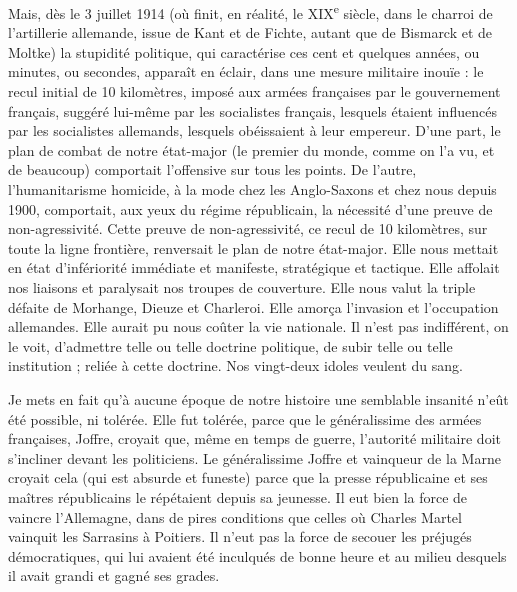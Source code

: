 \documentclass[french,twoside]{book} %
\begin{document}
Mais, dès le 3 juillet 1914 (où finit, en réalité, le XIX\textsuperscript{e} siècle, dans le charroi de l’artillerie allemande, issue de Kant et de Fichte, autant que de Bismarck et de Moltke) la stupidité politique, qui caractérise ces cent et quelques années, ou minutes, ou secondes, apparaît en éclair, dans une mesure militaire inouïe : le recul initial de 10 kilomètres, imposé aux armées françaises par le gouvernement français, suggéré lui-même par les socialistes français, lesquels étaient influencés par les socialistes allemands, lesquels obéissaient à leur empereur. D’une part, le plan de combat de notre état-major (le premier du monde, comme on l’a vu, et de beaucoup) comportait l’offensive sur tous les points. De l’autre, l’humanitarisme homicide, à la mode chez les Anglo-Saxons et chez nous depuis 1900, comportait, aux yeux du régime républicain, la nécessité d’une preuve de non-agressivité. Cette preuve de non-agressivité, ce recul de 10 kilomètres, sur toute la ligne frontière, renversait le plan de notre état-major. Elle nous mettait en état d’infériorité immédiate et manifeste, stratégique et tactique. Elle affolait nos liaisons et paralysait nos troupes de couverture. Elle nous valut la triple défaite de Morhange, Dieuze et Charleroi. Elle amorça l’invasion et l’occupation allemandes. Elle aurait pu nous coûter la vie nationale. Il n’est pas indifférent, on le voit, d’admettre telle ou telle doctrine politique, de subir telle ou telle institution ; reliée à cette doctrine. Nos vingt-deux idoles veulent du sang.\par
Je mets en fait qu’à aucune époque de notre histoire une semblable insanité n’eût été possible, ni tolérée. Elle fut tolérée, parce que le généralissime des armées françaises, Joffre, croyait que, même en temps de guerre, l’autorité militaire doit s’incliner devant les politiciens. Le généralissime Joffre et vainqueur de la Marne croyait cela (qui est absurde et funeste) parce que la presse républicaine et ses maîtres républicains le répétaient depuis sa jeunesse. Il eut bien la force de vaincre l’Allemagne, dans de pires conditions que celles où Charles Martel vainquit les Sarrasins à Poitiers. Il n’eut pas la force de secouer les préjugés démocratiques, qui lui avaient été inculqués de bonne heure et au milieu desquels il avait grandi et gagné ses grades.\par
\end{document}
